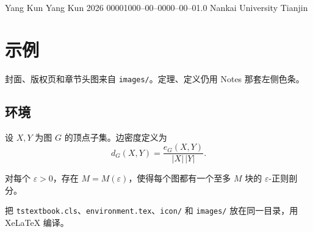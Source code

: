 \documentclass{tstextbook}
\begin{document}
       {Yang Kun}
       {Yang Kun}
       {2026}
       {00001}{000--00--0000--00--0}{1.0}
       {Nankai University}
       {Tianjin}

\chapter{示例}

\begin{summary}
封面、版权页和章节头图来自 \texttt{images/}。定理、定义仍用 Notes 那套左侧色条。
\end{summary}

\section{环境}

\begin{definition}[边密度]
设 $X,Y$ 为图 $G$ 的顶点子集。边密度定义为
\[
d_G(X,Y)=\frac{e_G(X,Y)}{|X|\,|Y|}.
\]
\end{definition}

\begin{theorem}[正则性引理]
对每个 $\varepsilon>0$，存在 $M=M(\varepsilon)$，使得每个图都有一个至多 $M$ 块的 $\varepsilon$-正则剖分。
\end{theorem}

\begin{remark}
把 \texttt{tstextbook.cls}、\texttt{environment.tex}、\texttt{icon/} 和 \texttt{images/} 放在同一目录，用 XeLaTeX 编译。
\end{remark}
\end{document}
